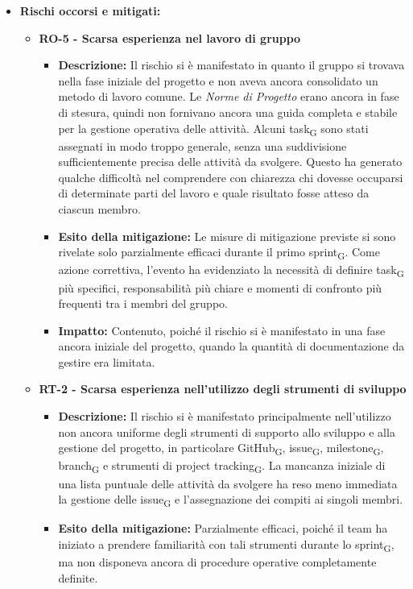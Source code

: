 \documentclass[a4paper, 10pt, colorlinks=true, linkcolor=black, urlcolor=blue, citecolor=blue, hidelinks]{article}
\begin{document}
\begin{itemize}
    \item \textbf{Rischi occorsi e mitigati:}
    \begin{itemize}
        \item \textbf{RO-5 - Scarsa esperienza nel lavoro di gruppo}
        \begin{itemize}
            \item \textbf{Descrizione:} Il rischio si è manifestato in quanto il gruppo si trovava nella fase iniziale del progetto e non aveva ancora consolidato un metodo di lavoro comune. Le \textit{Norme di Progetto} erano ancora in fase di stesura, quindi non fornivano ancora una guida completa e stabile per la gestione operativa delle attività. Alcuni task\textsubscript{G} sono stati assegnati in modo troppo generale, senza una suddivisione sufficientemente precisa delle attività da svolgere. Questo ha generato qualche difficoltà nel comprendere con chiarezza chi dovesse occuparsi di determinate parti del lavoro e quale risultato fosse atteso da ciascun membro.
            \item \textbf{Esito della mitigazione:} Le misure di mitigazione previste si sono rivelate solo parzialmente efficaci durante il primo sprint\textsubscript{G}. Come azione correttiva, l'evento ha evidenziato la necessità di definire task\textsubscript{G} più specifici, responsabilità più chiare e momenti di confronto più frequenti tra i membri del gruppo.
            \item \textbf{Impatto:} Contenuto, poiché il rischio si è manifestato in una fase ancora iniziale del progetto, quando la quantità di documentazione da gestire era limitata.
        \end{itemize}
        \item \textbf{RT-2 - Scarsa esperienza nell'utilizzo degli strumenti di sviluppo}
        \begin{itemize}
            \item \textbf{Descrizione:} Il rischio si è manifestato principalmente nell'utilizzo non ancora uniforme degli strumenti di supporto allo sviluppo e alla gestione del progetto, in particolare GitHub\textsubscript{G}, issue\textsubscript{G}, milestone\textsubscript{G}, branch\textsubscript{G} e strumenti di project tracking\textsubscript{G}. La mancanza iniziale di una lista puntuale delle attività da svolgere ha reso meno immediata la gestione delle issue\textsubscript{G} e l'assegnazione dei compiti ai singoli membri.
            \item \textbf{Esito della mitigazione:} Parzialmente efficaci, poiché il team ha iniziato a prendere familiarità con tali strumenti durante lo sprint\textsubscript{G}, ma non disponeva ancora di procedure operative completamente definite.

\end{itemize}
\end{itemize}
\end{itemize}
\end{document}
